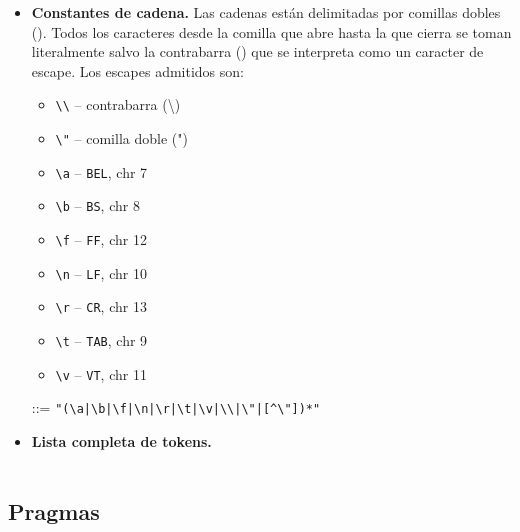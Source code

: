 \documentclass{article}
\begin{document}
\begin{itemize}
\item {\bf Constantes de cadena.}
  Las cadenas est\'an delimitadas por comillas dobles ().
  Todos los caracteres desde la comilla que abre hasta la que cierra se
  toman literalmente salvo la contrabarra (\chr{\textbackslash}) que se
  interpreta como un caracter de escape.
  Los escapes admitidos son:
  \begin{itemize}
  \item \texttt{\textbackslash\textbackslash} -- contrabarra (\textbackslash)
  \item \texttt{\textbackslash"} -- comilla doble (")
  \item \texttt{\textbackslash{a}} -- \texttt{BEL}, chr 7
  \item \texttt{\textbackslash{b}} -- \texttt{BS}, chr 8
  \item \texttt{\textbackslash{f}} -- \texttt{FF}, chr 12
  \item \texttt{\textbackslash{n}} -- \texttt{LF}, chr 10
  \item \texttt{\textbackslash{r}} -- \texttt{CR}, chr 13
  \item \texttt{\textbackslash{t}} -- \texttt{TAB}, chr 9
  \item \texttt{\textbackslash{v}} -- \texttt{VT}, chr 11
  \end{itemize}
  \begin{center}
     ::= \texttt{"(\textbackslash{a}|\textbackslash{b}|\textbackslash{f}|\textbackslash{n}|\textbackslash{r}|\textbackslash{t}|\textbackslash{v}|\textbackslash\textbackslash|\textbackslash"|[\^{}\textbackslash"])*"}
  \end{center}

\item {\bf Lista completa de tokens.}
  \begin{longtable}{llp{}}
  
  \end{longtable}
\end{itemize}

\subsection{Pragmas}
\end{document}
